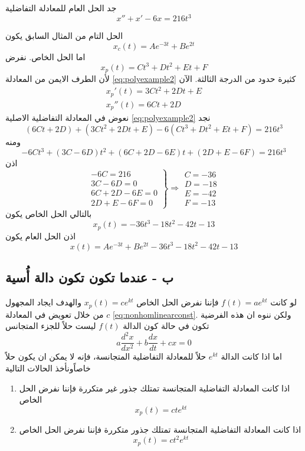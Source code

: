\begin{example}
	جد الحل العام للمعادلة التفاضلية
	\begin{equation}
		\label{eq:polyexample2}
		x'' + x' - 6x = 216 t^3
	\end{equation}
\end{example}
\begin{solution}
	الحل التام من المثال السابق يكون
	\[
	x_c(t) = A e^{-3t} + B e^{2t}
	\]
	اما الحل الخاص. نفرض 
	\[
	x_p(t) = C t^3 + D t^2 + E t + F
	\]
	لأن الطرف الايمن من المعادلة \eqref{eq:polyexample2} كثيرة حدود من الدرجة الثالثة. الآن
	\begin{gather*}
		x_p'(t) = 3C t^2 + 2Dt + E\\
		x_p''(t) = 6Ct + 2D
	\end{gather*}
	نعوض في المعادلة التفاضلية الاصلية \eqref{eq:polyexample2} نجد
	\[
	(6Ct + 2D) + (3C t^2 + 2Dt + E) - 6(C t^3 + D t^2 + E t + F) = 216t^3
	\]
	ومنه
	\[
	-6C t^3 +(3C - 6D)t^2 + (6C + 2D - 6E) t + (2D + E -6F) = 216t^3
	\]
	اذن
	\[
	\left.
	\begin{array}{r}
		-6C = 216\\
		3C - 6D = 0\\
		6C + 2D - 6E =0\\
		2D + E - 6F = 0 
	\end{array}
	\right\} \Rightarrow 
	\begin{array}{c}
		C= -36\\
		D = -18\\
		E = -42\\
		F = -13
	\end{array}
	\]
	بالتالي الحل الخاص يكون
	\[
	x_p(t) = -36t^3 -18t^2 -42t - 13
	\]
	اذن الحل العام يكون
	\[
	x(t) = A e^{-3t} + B e^{2t} -36t^3 -18t^2 -42t - 13
	\]
\end{solution}


\subsection*{ب - عندما تكون  تكون دالة أُسية}
لو كانت $f(t) = ae^{kt}$ فإننا نفرض الحل الخاص $x_p(t) = ce^{kt}$ والهدف ايجاد المجهول $c$ من خلال تعويض في المعادلة \eqref{eq:nonhomlinearconst}. ولكن ننوه ان هذه الفرضية تكون في حالة كون الدالة $f(t)$ ليست حلاً للجزء المتجانس
\[
a \frac{d^2 x}{dx^2} + b \frac{dx}{dt} + cx = 0
\]
اما اذا كانت الدالة $e^{kt}$ حلاً للمعادلة التفاضلية المتجانسة، فإنه لا يمكن ان يكون حلاً خاصاًونأخذ الحالات التالية
\begin{enumerate}
	\item اذا كانت المعادلة التفاضلية المتجانسة تمتلك جذور غير متكررة فإننا  نفرض الحل الخاص
	\[
	x_p(t) = c t e^{kt}
	\]
	
	\item اذا كانت المعادلة التفاضلية المتجانسة تمتلك جذور متكررة فإننا  نفرض الحل الخاص
	\[
	x_p(t) = c t^2 e^{kt}
	\]
\end{enumerate}

